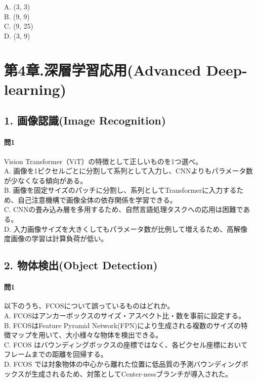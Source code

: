 \documentclass[
  letterpaper,
  DIV=11,
  numbers=noendperiod]{scrreprt}
\begin{document}
A. (3, 3)\\
B. (9, 9)\\
C. (9, 25)\\
D. (3, 9)

\part{第4章.深層学習応用(Advanced Deep-learning)}

\chapter{1. 画像認識(Image
Recognition)}\label{ux753bux50cfux8a8dux8b58image-recognition}

\subsection{問1}\label{ux554f1-2}

Vision Transformer（ViT）の特徴として正しいものを1つ選べ。\\
A.
画像を1ピクセルごとに分割して系列として入力し、CNNよりもパラメータ数が少なくなる傾向がある。\\
B.
画像を固定サイズのパッチに分割し、系列としてTransformerに入力するため、自己注意機構で画像全体の依存関係を学習できる。\\
C.
CNNの畳み込み層を多用するため、自然言語処理タスクへの応用は困難である。\\
D.
入力画像サイズを大きくしてもパラメータ数が比例して増えるため、高解像度画像の学習は計算負荷が低い。

\chapter{2. 物体検出(Object
Detection)}\label{ux7269ux4f53ux691cux51faobject-detection}

\subsection{問1}\label{ux554f1-3}

以下のうち、FCOSについて誤っているものはどれか。\\
A. FCOSはアンカーボックスのサイズ・アスペクト比・数を事前に設定する。\\
B. FCOSはFeature Pyramid
Network(FPN)により生成される複数のサイズの特徴マップを用いて、大小様々な物体を検出できる。\\
C. FCOS
はバウンディングボックスの座標ではなく、各ピクセル座標においてフレームまでの距離を回帰する。\\
D. FCOS
では対象物体の中心から離れた位置に低品質の予測バウンディングボックスが生成されるため、対策としてCenter-nessブランチが導入された。
\end{document}
